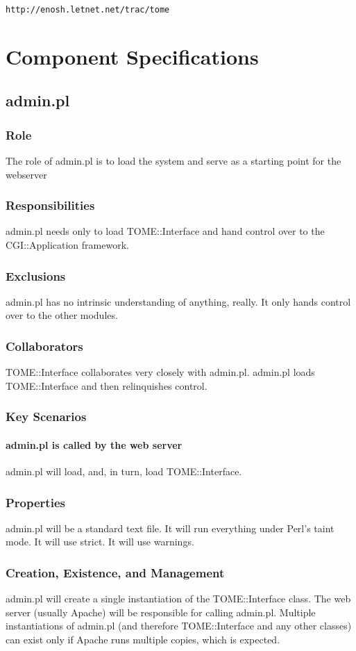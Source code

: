 \documentclass[12pt,titlepage]{article}
\begin{document}
\texttt{http://enosh.letnet.net/trac/tome}

\section{Component Specifications}
\subsection{admin.pl}
\subsubsection{Role}
The role of admin.pl is to load the system and serve as a starting point for the webserver
\subsubsection{Responsibilities}
admin.pl needs only to load TOME::Interface and hand control over to the CGI::Application framework.
\subsubsection{Exclusions}
admin.pl has no intrinsic understanding of anything, really.  It only hands control over to the other modules.
\subsubsection{Collaborators}
TOME::Interface collaborates very closely with admin.pl.  admin.pl loads TOME::Interface and then relinquishes control.
\subsubsection{Key Scenarios}
\paragraph{admin.pl is called by the web server}
admin.pl will load, and, in turn, load TOME::Interface.
\subsubsection{Properties}
admin.pl will be a standard text file.  It will run everything under Perl's taint mode.  It will use strict.  It will use warnings. 
\subsubsection{Creation, Existence, and Management}
admin.pl will create a single instantiation of the TOME::Interface class.  The web server (usually Apache) will be responsible for calling admin.pl.  Multiple instantiations of admin.pl (and therefore TOME::Interface and any other classes) can exist only if Apache runs multiple copies, which is expected.
\end{document}

